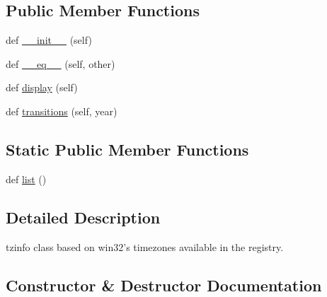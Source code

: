 \subsection*{Public Member Functions}
\begin{DoxyCompactItemize}
\item 
def \hyperlink{classdateutil_1_1tz_1_1win_1_1tzwinbase_a519685bd5f3c6a6114da8bd84f8d0be4}{\+\_\+\+\_\+init\+\_\+\+\_\+} (self)
\item 
def \hyperlink{classdateutil_1_1tz_1_1win_1_1tzwinbase_a77b7ad263c6a1e477e43debafd40aa49}{\+\_\+\+\_\+eq\+\_\+\+\_\+} (self, other)
\item 
def \hyperlink{classdateutil_1_1tz_1_1win_1_1tzwinbase_a2f7c9d016f8f34e967668385f88f4434}{display} (self)
\item 
def \hyperlink{classdateutil_1_1tz_1_1win_1_1tzwinbase_a933b1fa2bdf0c9ab64a95ae1543d3177}{transitions} (self, year)
\end{DoxyCompactItemize}
\subsection*{Static Public Member Functions}
\begin{DoxyCompactItemize}
\item 
def \hyperlink{classdateutil_1_1tz_1_1win_1_1tzwinbase_a0adde8a45e76676235aae7766f7189a7}{list} ()
\end{DoxyCompactItemize}


\subsection{Detailed Description}
\begin{DoxyVerb}tzinfo class based on win32's timezones available in the registry.\end{DoxyVerb}
 

\subsection{Constructor \& Destructor Documentation}
\mbox{\label{classdateutil_1_1tz_1_1win_1_1tzwinbase_a519685bd5f3c6a6114da8bd84f8d0be4}} 
